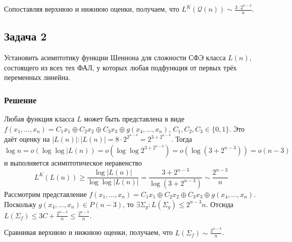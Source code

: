 \documentclass[11pt]{article}
\newcounter{th}\setcounter{th}{0}
\begin{document}
Сопоставляя верхнюю и нижнюю оценки, получаем, что \(L^K(\mathcal{Q}(n)) \sim \frac{3\cdot2^{n - 2}}n\).
\subsection{Задача 2}
\label{sec:org383591a}
Установить асимптотику функции Шеннона для сложности СФЭ класса \(L(n)\), состоящего из всех тех ФАЛ, у
которых любая подфункция от первых трёх переменных линейна.
\subsubsection{Решение}
\label{sec:org10ceb44}
Любая функция класса \(L\) может быть представлена в виде
\(f(x_1, \ldots, x_n) = C_1x_1 \oplus C_2x_2 \oplus C_3x_3 \oplus g(x_4, \ldots, x_n)\),
\(C_1, C_2, C_3 \in \{0, 1\}\).
Это даёт оценку на \(|L(n)|: |L(n)| = 8\cdot2^{2^{n - 3}} = 2^{3 + 2^{n - 3}}\). Тогда
\begin{equation*}
\log n = o(\log\log|L(n)) = o(\log\log2^{3 + 2^{n - 3}}) = o(\log(3 + 2^{n - 3})) = o(n - 3)
\end{equation*}
и выполняется асимптотическое неравенство
\begin{equation*}
L^K(L(n)) \geq \frac{\log|L(n)|}{\log\log|L(n)|} = \frac{3 + 2^{n - 3}}{\log (3 + 2^{n - 3})}
\sim \frac{2^{n - 3}}n
\end{equation*}
Рассмотрим представление
\(f(x_1, \ldots, x_n) = C_1x_1\oplus C_2x_2\oplus C_3x_3\oplus g(x_4, \ldots, x_n)\). Поскольку
\(g(x_4, \ldots, x_n) \in P(n - 3)\), то \(\exists \Sigma_g: L(\Sigma_g) \leq 2^{n - 3}n\). Отсюда
\(L(\Sigma_f) \leq 3C + \frac{2^{n - 3}}n \leq \frac{2^{n - 3}}n\).

Сравнивая верхнюю и нижнюю оценки, получаем, что \(L(\Sigma_f) \sim \frac{2^{n - 3}}n\).
\end{document}
